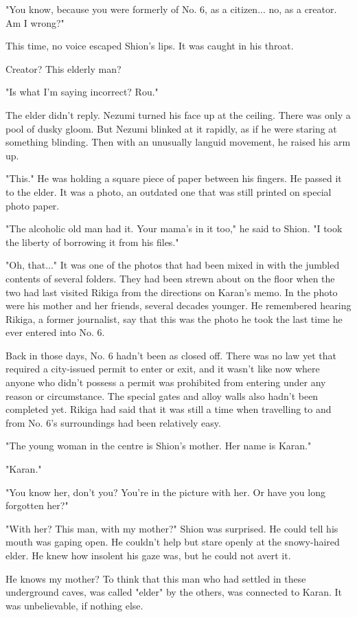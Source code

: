 "You know, because you were formerly of No. 6, as a citizen... no, as a
creator. Am I wrong?"

This time, no voice escaped Shion's lips. It was caught in his throat.

Creator? This elderly man?

"Is what I'm saying incorrect? Rou."

The elder didn't reply. Nezumi turned his face up at the ceiling. There
was only a pool of dusky gloom. But Nezumi blinked at it rapidly, as if
he were staring at something blinding. Then with an unusually languid
movement, he raised his arm up.

"This." He was holding a square piece of paper between his fingers. He
passed it to the elder. It was a photo, an outdated one that was still
printed on special photo paper.

"The alcoholic old man had it. Your mama's in it too," he said to Shion.
"I took the liberty of borrowing it from his files."

"Oh, that..." It was one of the photos that had been mixed in with the
jumbled contents of several folders. They had been strewn about on the
floor when the two had last visited Rikiga from the directions on
Karan's memo. In the photo were his mother and her friends, several
decades younger. He remembered hearing Rikiga, a former journalist, say
that this was the photo he took the last time he ever entered into No.
6.

Back in those days, No. 6 hadn't been as closed off. There was no law
yet that required a city-issued permit to enter or exit, and it wasn't
like now where anyone who didn't possess a permit was prohibited from
entering under any reason or circumstance. The special gates and alloy
walls also hadn't been completed yet. Rikiga had said that it was still
a time when travelling to and from No. 6's surroundings had been
relatively easy.

"The young woman in the centre is Shion's mother. Her name is Karan."

"Karan."

"You know her, don't you? You're in the picture with her. Or have you
long forgotten her?"

"With her? This man, with my mother?" Shion was surprised. He could tell
his mouth was gaping open. He couldn't help but stare openly at the
snowy-haired elder. He knew how insolent his gaze was, but he could not
avert it.

He knows my mother? To think that this man who had settled in these
underground caves, was called "elder" by the others, was connected to
Karan. It was unbelievable, if nothing else.

